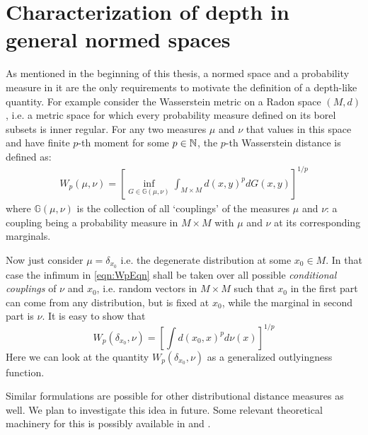 
\section{Characterization of depth in general normed spaces}
As mentioned in the beginning of this thesis, a normed space and a probability measure in it are the only requirements to motivate the definition of a depth-like quantity. For example consider the Wasserstein metric on a Radon space $(M,d)$, i.e. a metric space for which every probability measure defined on its borel subsets is inner regular. For any two measures $\mu$ and $\nu$ that values in this space and have finite $p$-th moment for some $p \in {\mathbb{N}}$, the $p$-th Wasserstein distance is defined as:
%
\begin{align}\label{eqn:WpEqn}
W_p (\mu, \nu) = \left[ \inf_{ G \in \mathbb G (\mu, \nu)} \int_{M \times M} d(x, y)^p dG(x,y) \right]^{1/p}
\end{align}
%
where $\mathbb G (\mu, \nu)$ is the collection of all `couplings' of the measures $\mu$ and $\nu$: a coupling being a probability measure in $M \times M$ with $\mu$ and $\nu$ at its corresponding marginals.

Now just consider $\mu = \delta_{ x_0}$ i.e. the degenerate distribution at some $x_0 \in M$. In that case the infimum in \ref{eqn:WpEqn} shall be taken over all possible \textit{conditional couplings} of $\nu$ and $x_0$, i.e. random vectors in $M \times M$ such that $x_0$ in the first part can come from any distribution, but is fixed at $x_0$, while the marginal in second part is $\nu$. It is easy to show that
%
$$
W_p ( \delta_{ x_0}, \nu) = \left[ \int d(x_0, x)^p d\nu (x) \right]^{1/p}
$$
%
Here we can look at the quantity $W_p (\delta_{ x_0}, \nu)$ as a generalized outlyingness function.

Similar formulations are possible for other distributional distance measures as well. We plan to investigate this idea in future. Some relevant theoretical machinery for this is possibly available in \cite{LeskelaVihola15} and \cite{DedeckerMichel11}.

